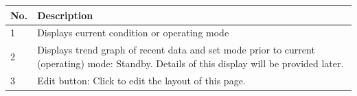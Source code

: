 \documentclass{article}
\begin{document}
\begin{longtable}[]{@{}|l|l|@{}}
\toprule
\rowcolor{magenta}\begin{minipage}[b]{0.07\columnwidth}\raggedright
{\bf{No.}}\strut
\end{minipage} & \begin{minipage}[b]{0.88\columnwidth}\raggedright
{\bf{Description}}\strut
\end{minipage}\tabularnewline
\midrule
\endhead
\begin{minipage}[t]{0.07\columnwidth}\raggedright
1\strut
\end{minipage} & \begin{minipage}[t]{0.88\columnwidth}\raggedright
Displays current condition or operating mode\strut
\end{minipage}\tabularnewline
\begin{minipage}[t]{0.07\columnwidth}\raggedright
2\strut
\end{minipage} & \begin{minipage}[t]{0.88\columnwidth}\raggedright
Displays trend graph of recent data and set mode prior to current
(operating) mode: Standby. Details of this display will be provided
later.\strut
\end{minipage}\tabularnewline
\begin{minipage}[t]{0.07\columnwidth}\raggedright
3\strut
\end{minipage} & \begin{minipage}[t]{0.88\columnwidth}\raggedright
Edit button: Click to edit the layout of this page.\strut
\end{minipage}\tabularnewline
\bottomrule
\end{longtable}
\end{document}
